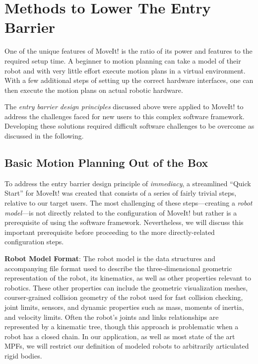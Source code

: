 \documentclass[10pt,journal,compsoc]{joser1}
\begin{document}
{%
\section{Methods to Lower The Entry Barrier}
\label{sec::lowering_barriers}

One of the unique features of MoveIt! is the ratio of its power and features to the required setup time. A beginner to motion planning can take a model of their robot and with very little effort execute motion plans in a virtual environment. With a few additional steps of setting up the correct hardware interfaces, one can then execute the motion plans on actual robotic hardware.

The \textit{entry barrier design principles} discussed above were applied to MoveIt! to address the challenges faced for new users to this complex software framework. Developing these solutions required difficult software challenges to be overcome as discussed in the following.

\subsection{Basic Motion Planning Out of the Box}

To address the entry barrier design principle of \textit{immediacy}, a streamlined ``Quick Start'' for MoveIt! was created that consists of a series of fairly trivial steps, relative to our target users. The most challenging of these steps---creating a \textit{robot model}---is not directly related to the configuration of MoveIt! but rather is a prerequisite of using the software framework. Nevertheless, we will discuss this important prerequisite before proceeding to the more directly-related configuration steps.

{\bf Robot Model Format}: The robot model is the data structures and accompanying file format used to describe the three-dimensional geometric representation of the robot, its kinematics, as well as other properties relevant to robotics. These other properties can include the geometric visualization meshes, courser-grained collision geometry of the robot used for fast collision checking, joint limits, sensors, and dynamic properties such as mass, moments of inertia, and velocity limits. Often the robot's joints and links relationships are represented by a kinematic tree, though this approach is problematic when a robot has a closed chain. In our application, as well as most state of the art MPFs, we will restrict our definition of modeled robots to arbitrarily articulated rigid bodies. 

}
\end{document}
